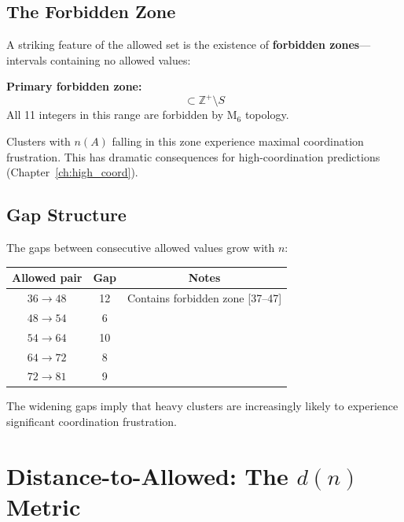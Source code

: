 \subsection{The Forbidden Zone}

A striking feature of the allowed set is the existence of \textbf{forbidden
zones}---intervals containing no allowed values:

\begin{resultbox}
    \textbf{Primary forbidden zone:}
    \begin{equation}
        [37, 47] \subset \mathbb{Z}^+ \setminus S
    \end{equation}
    All 11 integers in this range are forbidden by M$_6$ topology.
    \tagDer
\end{resultbox}

Clusters with $n(A)$ falling in this zone experience maximal coordination
frustration. This has dramatic consequences for high-coordination predictions
(Chapter~\ref{ch:high_coord}).

\subsection{Gap Structure}

The gaps between consecutive allowed values grow with $n$:

\begin{center}
\begin{tabular}{ccc}
    \toprule
    Allowed pair & Gap & Notes \\
    \midrule
    $36 \to 48$ & 12 & Contains forbidden zone [37--47] \\
    $48 \to 54$ & 6 & \\
    $54 \to 64$ & 10 & \\
    $64 \to 72$ & 8 & \\
    $72 \to 81$ & 9 & \\
    \bottomrule
\end{tabular}
\end{center}

The widening gaps imply that heavy clusters are increasingly likely to
experience significant coordination frustration. \tagP

\section{Distance-to-Allowed: The $d(n)$ Metric}
\label{sec:frustrated:dn}

